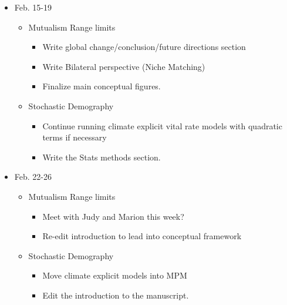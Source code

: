 \documentclass{article}
\begin{document}
\begin{itemize}
\begin{itemize}
\end{itemize}

\item{Feb. 15-19}
\begin{itemize}
  \item{Mutualism Range limits}
     \begin{itemize}
         \item{Write global change/conclusion/future directions section}
         \item{Write Bilateral perspective (Niche Matching)}
         \item{Finalize main conceptual figures.}
     \end{itemize}

  \item{Stochastic Demography}
     \begin{itemize}
        \item{Continue running climate explicit vital rate models with quadratic terms if necessary}
        \item{Write the Stats methods section.}
     \end{itemize}

\end{itemize}

\item{Feb. 22-26}
   \begin{itemize}
     \item{Mutualism Range limits}
        \begin{itemize}
            \item{Meet with Judy and Marion this week?}
            \item{Re-edit introduction to lead into conceptual framework}
            
        \end{itemize}
   
     \item{Stochastic Demography}
        \begin{itemize}
           \item{Move climate explicit models into MPM}
           \item{Edit the introduction to the manuscript.}
        \end{itemize}

  \end{itemize}

\end{itemize}
\end{document}
